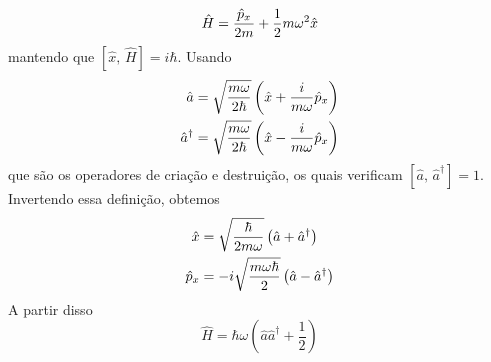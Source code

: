\documentclass[12pt,brazil,table]{beamer}
\begin{document}
\begin{frame}
\begin{columns}[T]
  \[
    \hat{H} = \dfrac{\hat{p}_x}{2m}+\dfrac{1}{2}m\omega^2 \hat{x}\vspace*{-0.2cm}
  \]
  mantendo que $\left[ \hat{x},\, \hat{H}\right]=i\hbar$. Usando\vspace*{-0.25cm}
  \[
    \begin{align*}
      \hat{a} &= \sqrt{\dfrac{m\omega}{2\hbar}}\left(\hat{x} + \dfrac{i}{m\omega}\hat{p}_x\right)\\
      \hat{a}^\dagger &= \sqrt{\dfrac{m\omega}{2\hbar}}\left(\hat{x} - \dfrac{i}{m\omega}\hat{p}_x\right)
    \end{align*}\vspace*{-0.25cm}
  \]
  que são os operadores de criação e destruição, os quais verificam $\left[ \hat{a},\, \hat{a}^\dagger \right]=1$. Invertendo essa definição, obtemos\vspace*{-0.35cm}
  \[
    \begin{align*}
      \hat{x} &= \sqrt{\dfrac{\hbar}{2 m\omega}}\left(\hat{a} + \hat{a}^\dagger\right)\\
      \hat{p}_x &= -i\sqrt{\dfrac{ m\omega\hbar}{2}}\left(\hat{a} - \hat{a}^\dagger\right)
    \end{align*}\vspace*{-0.25cm}
  \]
  A partir disso\vspace*{-0.5cm}
  \[
   \hat{H} = \hbar\omega \left(\hat{a}\hat{a}^\dagger + \dfrac{1}{2} \right)
  \]
  \end{columns}

\end{frame}

\end{document}
